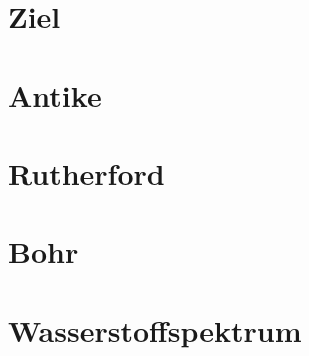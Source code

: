 \section{Ziel}


\section{Antike}


\section{Rutherford}


\section{Bohr}


\section{Wasserstoffspektrum} \label{sec:plattenkondensator}

